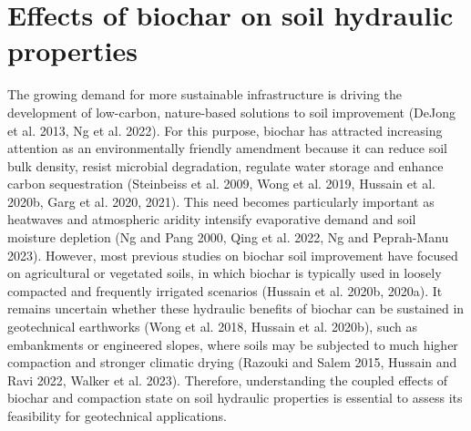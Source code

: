 \section{Effects of biochar on soil hydraulic properties}
\label{sec:LR-biochar-hydraulic-effects}
The growing demand for more sustainable infrastructure is driving the development of low-carbon, nature-based solutions to soil improvement (DeJong et al. 2013, Ng et al. 2022). For this purpose, biochar has attracted increasing attention as an environmentally friendly amendment because it can reduce soil bulk density, resist microbial degradation, regulate water storage and enhance carbon sequestration (Steinbeiss et al. 2009, Wong et al. 2019, Hussain et al. 2020b, Garg et al. 2020, 2021). This need becomes particularly important as heatwaves and atmospheric aridity intensify evaporative demand and soil moisture depletion (Ng and Pang 2000, Qing et al. 2022, Ng and Peprah-Manu 2023). However, most previous studies on biochar soil improvement have focused on agricultural or vegetated soils, in which biochar is typically used in loosely compacted and frequently irrigated scenarios (Hussain et al. 2020b, 2020a). It remains uncertain whether these hydraulic benefits of biochar can be sustained in geotechnical earthworks (Wong et al. 2018, Hussain et al. 2020b), such as embankments or engineered slopes, where soils may be subjected to much higher compaction and stronger climatic drying (Razouki and Salem 2015, Hussain and Ravi 2022, Walker et al. 2023). Therefore, understanding the coupled effects of biochar and compaction state on soil hydraulic properties is essential to assess its feasibility for geotechnical applications.
